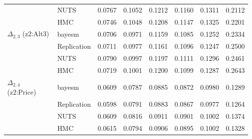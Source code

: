 \begin{tabular}{llcccccc}
 & NUTS & 0.0767 & 0.1052 & 0.1212 & 0.1160 & 0.1311 & 0.2112 \\
 & HMC & 0.0746 & 0.1048 & 0.1208 & 0.1147 & 0.1325 & 0.2201 \\
$\Delta_{2,3}$ (z2:Alt3) & bayesm & 0.0706 & 0.0971 & 0.1159 & 0.1085 & 0.1252 & 0.2334 \\
 & Replication & 0.0711 & 0.0977 & 0.1161 & 0.1096 & 0.1247 & 0.2500 \\
 & NUTS & 0.0790 & 0.0997 & 0.1197 & 0.1111 & 0.1296 & 0.2461 \\
 & HMC & 0.0719 & 0.1001 & 0.1200 & 0.1099 & 0.1287 & 0.2643 \\
$\Delta_{2,4}$ (z2:Price) & bayesm & 0.0609 & 0.0787 & 0.0885 & 0.0872 & 0.0980 & 0.1289 \\
 & Replication & 0.0598 & 0.0791 & 0.0883 & 0.0867 & 0.0977 & 0.1264 \\
 & NUTS & 0.0609 & 0.0816 & 0.0911 & 0.0901 & 0.1002 & 0.1374 \\
 & HMC & 0.0615 & 0.0794 & 0.0906 & 0.0895 & 0.1002 & 0.1328 \\
\bottomrule
\end{tabular}
